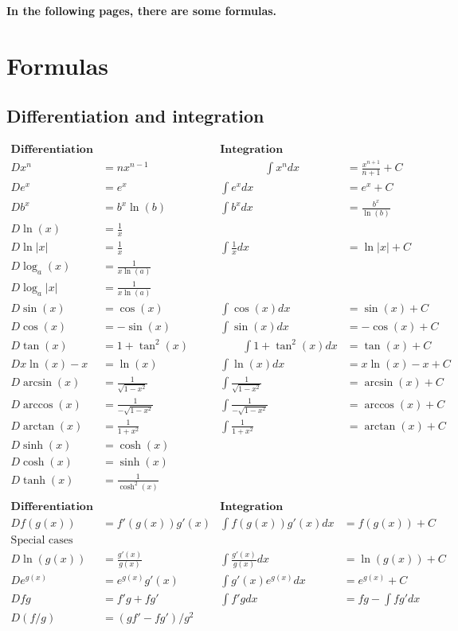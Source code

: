 \documentclass[12pt]{article}
\begin{document}
\textbf{In the following pages, there are some formulas.}

\newpage
\section*{Formulas}
\subsection*{Differentiation and integration}

$$
\begin{array}{rl|rl}
\textbf{Differentiation} && \textbf{Integration}&\\[2mm]
Dx^n&=nx^{n-1}     \qquad\qquad&\qquad\qquad\int x^ndx&=\frac{x^{n+1}}{n+1}+C \\[2mm]
De^x&=e^x &\int e^xdx&=e^x+C\\[2mm]
Db^x&=b^x\ln(b) & \int b^xdx&=\frac{b^x}{\ln(b)}\\[2mm]
D\ln(x)&=\frac{1}{x} &&\\[2mm]
D\ln|x|&=\frac{1}{x} &\int\frac{1}{x}dx&=\ln|x|+C\\[2mm]
D\log_a(x)&=\frac{1}{x\ln(a)} &&\\[2mm]
D\log_a|x|&=\frac{1}{x\ln(a)} &&\\[2mm]
D\sin(x)&=\cos(x)   &\int\cos(x)dx&=\sin(x)+C\\[2mm]
D\cos(x)&=-\sin(x)  &\int\sin(x)dx&=-\cos(x)+C\\[2mm]
D\tan(x)&=1+\tan^2(x) \qquad&\qquad\int 1+\tan^2(x)dx&=\tan(x)+C\\[2mm]

Dx\ln(x)-x&=\ln(x) & \int\ln(x)dx&=x\ln(x)-x+C\\[10mm]

D\arcsin(x)&=\frac{1}{\sqrt{1-x^2}} & \int\frac{1}{\sqrt{1-x^2}}&=\arcsin(x)+C\\
D\arccos(x)&=\frac{1}{-\sqrt{1-x^2}} & \int\frac{1}{-\sqrt{1-x^2}}&=\arccos(x)+C\\
D\arctan(x)&=\frac{1}{1+x^2} & \int\frac{1}{1+x^2}&=\arctan(x)+C\\

D\sinh(x)&=\cosh(x) &&\\
D\cosh(x)&=\sinh(x) &&\\
D\tanh(x)&=\frac{1}{\cosh^2(x)} &&\\
\end{array}  
$$
\vspace{1cm}
$$
\begin{array}{rl|rl}
\textbf{Differentiation} && \textbf{Integration}&\\[2mm]
D f(g(x))&=f'(g(x))g'(x) & \int f(g(x))g'(x)dx&=f(g(x))+C\\[2mm]
\textrm{Special cases} &&&\\
D\ln(g(x))&=\frac{g'(x)}{g(x)} & \int \frac{g'(x)}{g(x)}dx&=\ln(g(x))+C\\[2mm]
D e^{g(x)}&=e^{g(x)}g'(x) & \int g'(x)e^{g(x)}dx&=e^{g(x)}+C\\[10mm]
D fg&=f'g+fg'& \int f'g dx&=fg-\int fg'dx\\[2mm]
D (f/g)&=(gf'-fg')/g^2 &&\\[2mm]
\end{array}  
$$
\end{document}

